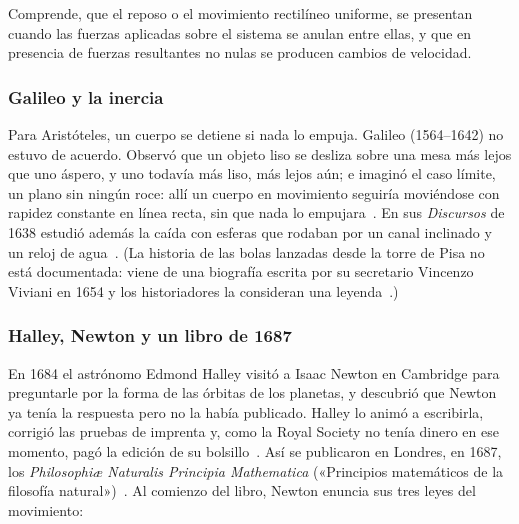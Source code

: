 \documentclass[11pt]{article}
\begin{document}
\begin{dba}
Comprende, que el reposo o el movimiento rectilíneo uniforme, se presentan cuando las fuerzas
aplicadas sobre el sistema se anulan entre ellas, y que en presencia de fuerzas resultantes no
nulas se producen cambios de velocidad.
\end{dba}


\subsubsection*{Galileo y la inercia}

Para Aristóteles, un cuerpo se detiene si nada lo empuja. Galileo (1564--1642) no estuvo de
acuerdo. Observó que un objeto liso se desliza sobre una mesa más lejos que uno áspero, y uno
todavía más liso, más lejos aún; e imaginó el caso límite, un plano sin ningún roce: allí un
cuerpo en movimiento seguiría moviéndose con rapidez constante en línea recta, sin que nada
lo empujara~\cite{recurso10}. En sus \emph{Discursos} de 1638 estudió además la caída con
esferas que rodaban por un canal inclinado y un reloj de agua~\cite{galileo1638}. (La historia
de las bolas lanzadas desde la torre de Pisa no está documentada: viene de una biografía
escrita por su secretario Vincenzo Viviani en 1654 y los historiadores la consideran una
leyenda~\cite{physicsworld}.)

\subsubsection*{Halley, Newton y un libro de 1687}

En 1684 el astrónomo Edmond Halley visitó a Isaac Newton en Cambridge para preguntarle por la
forma de las órbitas de los planetas, y descubrió que Newton ya tenía la respuesta pero no la
había publicado. Halley lo animó a escribirla, corrigió las pruebas de imprenta y, como la
Royal Society no tenía dinero en ese momento, pagó la edición de su bolsillo~\cite{halley}. Así
se publicaron en Londres, en 1687, los \emph{Philosophiæ Naturalis Principia Mathematica}
(«Principios matemáticos de la filosofía natural»)~\cite{newton1687}. Al comienzo del libro,
Newton enuncia sus tres leyes del movimiento:
\end{document}
